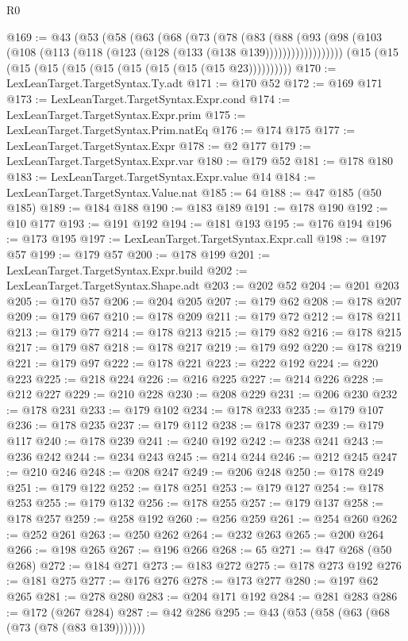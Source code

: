 \begin{lexlean}{R0}
\begin{coremodule}
@169 := @43
    (@53
      (@58
        (@63
          (@68
            (@73
              (@78
                (@83
                  (@88
                    (@93 (@98 (@103 (@108 (@113 (@118 (@123 (@128 (@133 (@138 @139))))))))))))))))))
    (@15 (@15 (@15 (@15 (@15 (@15 (@15 (@15 (@15 (@15 @23))))))))))
@170 := LexLeanTarget.TargetSyntax.Ty.adt
@171 := @170 @52
@172 := @169 @171
@173 := LexLeanTarget.TargetSyntax.Expr.cond
@174 := LexLeanTarget.TargetSyntax.Expr.prim
@175 := LexLeanTarget.TargetSyntax.Prim.natEq
@176 := @174 @175
@177 := LexLeanTarget.TargetSyntax.Expr
@178 := @2 @177
@179 := LexLeanTarget.TargetSyntax.Expr.var
@180 := @179 @52
@181 := @178 @180
@183 := LexLeanTarget.TargetSyntax.Expr.value @14
@184 := LexLeanTarget.TargetSyntax.Value.nat
@185 := 64
@188 := @47 @185 (@50 @185)
@189 := @184 @188
@190 := @183 @189
@191 := @178 @190
@192 := @10 @177
@193 := @191 @192
@194 := @181 @193
@195 := @176 @194
@196 := @173 @195
@197 := LexLeanTarget.TargetSyntax.Expr.call
@198 := @197 @57
@199 := @179 @57
@200 := @178 @199
@201 := LexLeanTarget.TargetSyntax.Expr.build
@202 := LexLeanTarget.TargetSyntax.Shape.adt
@203 := @202 @52
@204 := @201 @203
@205 := @170 @57
@206 := @204 @205
@207 := @179 @62
@208 := @178 @207
@209 := @179 @67
@210 := @178 @209
@211 := @179 @72
@212 := @178 @211
@213 := @179 @77
@214 := @178 @213
@215 := @179 @82
@216 := @178 @215
@217 := @179 @87
@218 := @178 @217
@219 := @179 @92
@220 := @178 @219
@221 := @179 @97
@222 := @178 @221
@223 := @222 @192
@224 := @220 @223
@225 := @218 @224
@226 := @216 @225
@227 := @214 @226
@228 := @212 @227
@229 := @210 @228
@230 := @208 @229
@231 := @206 @230
@232 := @178 @231
@233 := @179 @102
@234 := @178 @233
@235 := @179 @107
@236 := @178 @235
@237 := @179 @112
@238 := @178 @237
@239 := @179 @117
@240 := @178 @239
@241 := @240 @192
@242 := @238 @241
@243 := @236 @242
@244 := @234 @243
@245 := @214 @244
@246 := @212 @245
@247 := @210 @246
@248 := @208 @247
@249 := @206 @248
@250 := @178 @249
@251 := @179 @122
@252 := @178 @251
@253 := @179 @127
@254 := @178 @253
@255 := @179 @132
@256 := @178 @255
@257 := @179 @137
@258 := @178 @257
@259 := @258 @192
@260 := @256 @259
@261 := @254 @260
@262 := @252 @261
@263 := @250 @262
@264 := @232 @263
@265 := @200 @264
@266 := @198 @265
@267 := @196 @266
@268 := 65
@271 := @47 @268 (@50 @268)
@272 := @184 @271
@273 := @183 @272
@275 := @178 @273 @192
@276 := @181 @275
@277 := @176 @276
@278 := @173 @277
@280 := @197 @62 @265
@281 := @278 @280
@283 := @204 @171 @192
@284 := @281 @283
@286 := @172 (@267 @284)
@287 := @42 @286
@295 := @43 (@53 (@58 (@63 (@68 (@73 (@78 (@83 @139)))))))

\end{coremodule}
\end{lexlean}
